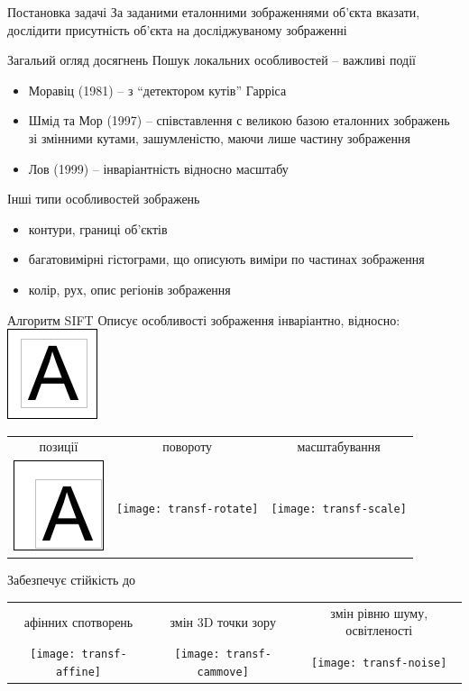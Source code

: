 \documentclass{beamer}
\begin{document}
\begin{frame}{Постановка задачі}
  За заданими еталонними зображеннями об'єкта вказати, дослідити присутність об'єкта на досліджуваному зображенні
\end{frame}

\begin{frame}{Загальий огляд досягнень}
  Пошук локальних особливостей -- важливі події
  \begin{itemize}
    \item Моравіц (1981) -- з ``детектором кутів'' Гарріса %
    \item Шмід та Мор (1997) -- співставлення с великою базою еталонних зображень зі змінними кутами, зашумленістю, маючи лише частину зображення
    \item Лов (1999) -- інваріантність відносно масштабу
  \end{itemize}
  \pause Інші типи особливостей зображень
  \begin{itemize}
    \item контури, границі об'єктів
    \item багатовимірні гістограми, що описують виміри по частинах зображення
    \item колір, рух, опис регіонів зображення
  \end{itemize}
\end{frame}

\begin{frame}{Алгоритм SIFT}
  Описує особливості зображення інваріантно, відносно:
  \includegraphics{transf-orig} \\
  \begin{tabular}{ccc}
    позиції & повороту & масштабування \\
    \includegraphics{transf-pos} & \texttt{[image: transf-rotate]} & \texttt{[image: transf-scale]} \\
  \end{tabular}

  Забезпечує стійкість до
  \begin{tabular}{ccc}
    афінних спотворень & змін 3D точки зору & змін рівню шуму, освітленості \\
    \texttt{[image: transf-affine]} & \texttt{[image: transf-cammove]} & \texttt{[image: transf-noise]} \\
  \end{tabular}
\end{frame}
\end{document}
